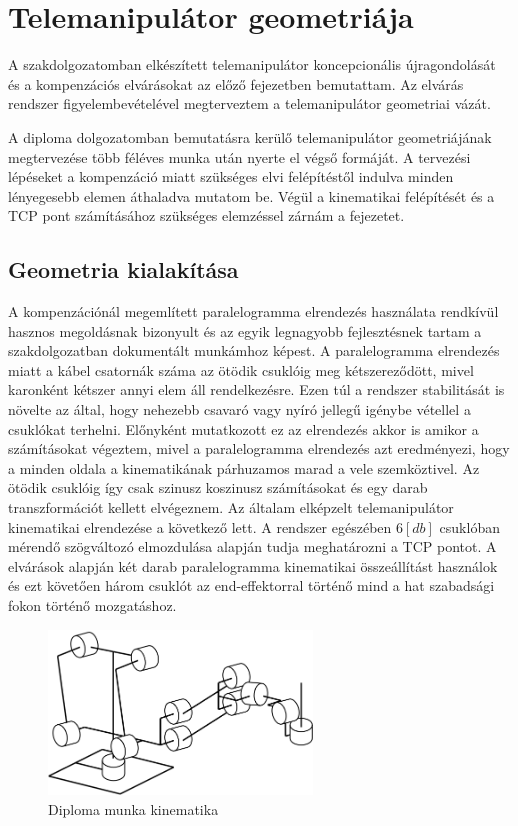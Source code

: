 \chapter{Telemanipulátor geometriája}
\label{sec:geometria}

A szakdolgozatomban elkészített telemanipulátor koncepcionális újragondolását és a kompenzációs elvárásokat az előző fejezetben bemutattam. Az elvárás rendszer figyelembevételével megterveztem a telemanipulátor geometriai vázát.

A diploma dolgozatomban bemutatásra kerülő telemanipulátor geometriájának megtervezése több féléves munka után nyerte el végső formáját. A tervezési lépéseket a kompenzáció miatt szükséges elvi felépítéstől indulva minden lényegesebb elemen áthaladva mutatom be. Végül a kinematikai felépítését és a TCP pont számításához szükséges elemzéssel zárnám a fejezetet.

\section{Geometria kialakítása}

A kompenzációnál megemlített paralelogramma elrendezés használata rendkívül hasznos megoldásnak bizonyult és az egyik legnagyobb fejlesztésnek tartam a szakdolgozatban dokumentált munkámhoz képest. A paralelogramma elrendezés
miatt a kábel csatornák száma az ötödik csuklóig meg kétszereződött, mivel karonként kétszer annyi elem áll rendelkezésre. Ezen túl a rendszer stabilitását is növelte az által, hogy nehezebb csavaró vagy nyíró jellegű igénybe vétellel a csuklókat terhelni. Előnyként mutatkozott ez az elrendezés akkor is amikor a számításokat végeztem, mivel a paralelogramma elrendezés azt eredményezi, hogy a minden oldala a kinematikának párhuzamos marad a vele szemköztivel. Az ötödik csuklóig így csak szinusz koszinusz számításokat és egy darab transzformációt kellett elvégeznem. Az általam elképzelt telemanipulátor kinematikai elrendezése a következő lett. A rendszer egészében $6[db]$ csuklóban mérendő szögváltozó elmozdulása alapján tudja meghatározni a TCP pontot. A elvárások alapján két darab paralelogramma kinematikai összeállítást használok és ezt követően három csuklót az end-effektorral történő mind a hat szabadsági fokon történő mozgatáshoz.

\begin{figure}[!ht]
\centering
\includegraphics[width=70mm, keepaspectratio]{figures/Diagrammok/Diploma_kinematika}
\caption{Diploma munka kinematika}
\label{fig:Diploma_kinematika}
\end{figure}

